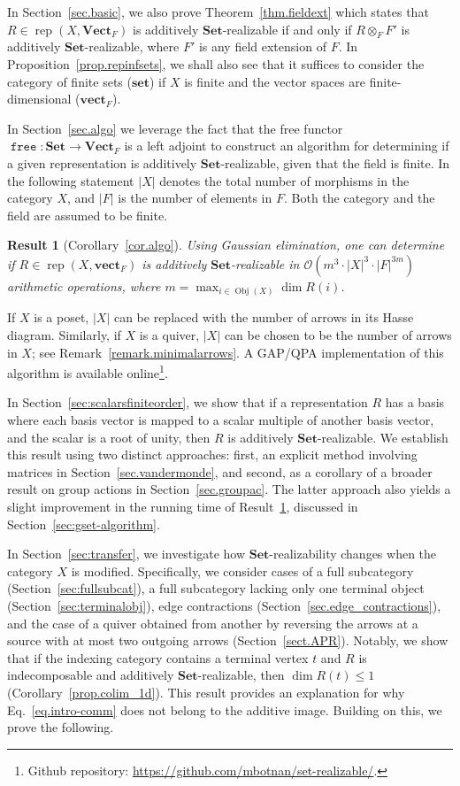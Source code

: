 \documentclass[a4paper]{amsart}
\theoremstyle{plain}
\newtheorem{resultx}{Result}
\theoremstyle{definition}
\theoremstyle{remark}
\newcommand{\funct}[1]{\operatorname{\mathtt{#1}}}
\newcommand{\Set}{\mathbf{Set}}
\newcommand{\set}{\mathbf{set}}
\newcommand{\VectF}{\mathbf{Vect}_F}
\newcommand{\vectF}{\mathbf{vect}_F}
\DeclareMathOperator{\rep}{rep}
\begin{document}
In Section~\ref{sec.basic}, we also prove Theorem~\ref{thm.fieldext} which states that $R\in \rep(X, \VectF)$ is additively $\Set$-realizable if and only if $R\otimes_F F'$ is additively $\Set$-realizable, where $F'$ is any field extension of $F$. In Proposition~\ref{prop.repinfsets}, we shall also see that it suffices to consider the category of finite sets ($\set$) if $X$  is finite and the vector spaces are finite-dimensional ($\vectF$). 


In Section~\ref{sec.algo} we leverage the fact that the free functor $\funct{free} \colon \Set\to \VectF$ is a left adjoint to construct an algorithm for determining if a given representation is additively $\Set$-realizable, given that the field is finite. In the following statement $|X|$ denotes the total number of morphisms in the category $X$, and $|F|$ is the number of elements in $F$. Both the category and the field are assumed to be finite.
\begin{resultx}[Corollary~\ref{cor.algo}]
\label{resX.gaussian}
Using Gaussian elimination, one can determine if $R\in \rep(X,\vectF)$ is additively $\Set$-realizable in $\mathcal{O}\left(m^3\cdot |X|^3\cdot |F|^{3m} \right)$ arithmetic operations, where $m = \max_{i\in \operatorname{Obj}(X)} \dim R(i)$.
\end{resultx}
If \( X \) is a poset, \( |X| \) can be replaced with the number of arrows in its Hasse diagram. Similarly, if \( X \) is a quiver, \( |X| \) can be chosen to be the number of arrows in \( X \); see Remark~\ref{remark.minimalarrows}.  A GAP/QPA \cite{GAP4,qpa} implementation of this algorithm is available online\footnote{Github repository: \url{https://github.com/mbotnan/set-realizable/}.}. 

In Section~\ref{sec:scalarsfiniteorder}, we show that if a representation $R$ has a basis where each basis vector is mapped to a scalar multiple of another basis vector, and the scalar is a root of unity, then $R$ is additively $\Set$-realizable. We establish this result using two distinct approaches: first, an explicit method involving matrices in Section~\ref{sec.vandermonde}, and second, as a corollary of a broader result on group actions in Section~\ref{sec.groupac}. The latter approach also yields a slight improvement in the running time of Result~\ref{resX.gaussian}, discussed in Section~\ref{sec:gset-algorithm}.

In Section~\ref{sec:transfer}, we investigate how $\Set$-realizability changes when the category $X$ is modified. Specifically, we consider cases of a full subcategory (Section~\ref{sec:fullsubcat}), a full subcategory lacking only one terminal object (Section~\ref{sec:terminalobj}), edge contractions (Section~\ref{sec.edge_contractions}), and the case of a quiver obtained from another by reversing the arrows at a source with at most two outgoing arrows (Section~\ref{sect.APR}). Notably, we show that if the indexing category contains a terminal vertex $t$ and $R$ is indecomposable and additively $\Set$-realizable, then $\dim R(t) \leq 1$ (Corollary~\ref{prop.colim_1d}). This result provides an explanation for why Eq.~\eqref{eq.intro-comm} does not belong to the additive image. Building on this, we prove the following.
\end{document}

